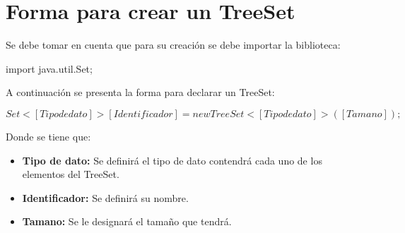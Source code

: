 \documentclass[12pt, letterpaper]{article} %
\begin{document}
\section*{Forma para crear un TreeSet}
Se debe tomar en cuenta que para su creación se debe importar la biblioteca:
\begin{center}
    import java.util.Set;
\end{center}
A continuación se presenta la forma para declarar un TreeSet:
\begin{center}
    $Set<[Tipo de dato]> [Identificador] = new TreeSet<[Tipo de dato]>([Tamano]);$
\end{center}
Donde se tiene que:
\begin{itemize}
    \item \textbf{Tipo de dato:} Se definirá el tipo de dato contendrá cada uno de los elementos del TreeSet.
    \item \textbf{Identificador:} Se definirá su nombre.
    \item \textbf{Tamano:}  Se le designará el tamaño que tendrá.
\end{itemize}
\end{document}
